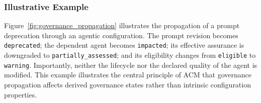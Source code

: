 \documentclass[10pt]{article}
\begin{document}
\subsubsection{Illustrative Example}

Figure~\ref{fig:governance_propagation} illustrates the propagation of a prompt
deprecation through an agentic configuration. The prompt revision becomes
\texttt{deprecated}; the dependent agent becomes \texttt{impacted}; its
effective assurance is downgraded to
\texttt{partially\_assessed}; and its eligibility changes from
\texttt{eligible} to
\texttt{warning}. Importantly, neither the lifecycle nor the declared quality
of the agent is modified. This example illustrates the central principle of ACM
that governance propagation affects derived governance states rather than
intrinsic configuration properties.
\end{document}
